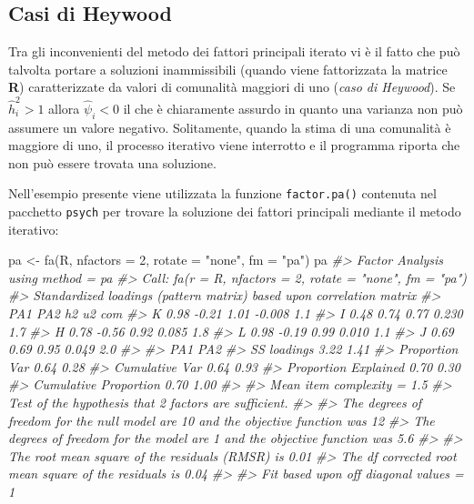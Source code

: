 \documentclass[
  11pt,
]{krantz}
\makeatletter
\newenvironment{Shaded}{\begin{snugshade}}{\end{snugshade}}
\newcommand{\AttributeTok}[1]{\textcolor[rgb]{0.61,0.61,0.61}{#1}}
\newcommand{\CommentTok}[1]{\textcolor[rgb]{0.37,0.37,0.37}{\textit{#1}}}
\newcommand{\DecValTok}[1]{\textcolor[rgb]{0.06,0.06,0.06}{#1}}
\newcommand{\FunctionTok}[1]{\textcolor[rgb]{0,0,0}{#1}}
\newcommand{\NormalTok}[1]{#1}
\newcommand{\OtherTok}[1]{\textcolor[rgb]{0.37,0.37,0.37}{#1}}
\newcommand{\StringTok}[1]{\textcolor[rgb]{0.5,0.5,0.5}{#1}}
\newenvironment{kframe}{%
\medskip{}
\setlength{\fboxsep}{.8em}
 \def\at@end@of@kframe{}%
 \ifinner\ifhmode%
  \def\at@end@of@kframe{\end{minipage}}%
  \begin{minipage}{\columnwidth}%
 \fi\fi%
 \def\FrameCommand##1{\hskip\@totalleftmargin \hskip-\fboxsep
 \colorbox{shadecolor}{##1}\hskip-\fboxsep
     \hskip-\linewidth \hskip-\@totalleftmargin \hskip\columnwidth}%
 \MakeFramed {\advance\hsize-\width
   \@totalleftmargin\z@ \linewidth\hsize
   \@setminipage}}%
 {\par\unskip\endMakeFramed%
 \at@end@of@kframe}
\renewenvironment{Shaded}{\begin{kframe}}{\end{kframe}}
\theoremstyle{definition}
\theoremstyle{definition}
\theoremstyle{definition}
\theoremstyle{definition}
\theoremstyle{remark}
\makeatother
\begin{document}
\hypertarget{casi-di-heywood}{%
\subsection{Casi di Heywood}\label{casi-di-heywood}}

Tra gli inconvenienti del metodo dei fattori principali iterato vi è il fatto che può talvolta portare a soluzioni inammissibili (quando viene fattorizzata la matrice \textbf{R}) caratterizzate da valori di comunalità maggiori di uno (\emph{caso di Heywood}). Se \(\hat{h}^2_i > 1\) allora \(\hat{\psi}_i < 0\) il che è chiaramente assurdo in quanto una varianza non può assumere un valore negativo. Solitamente, quando la stima di una comunalità è maggiore di uno, il processo iterativo viene interrotto e il programma riporta che non può essere trovata una soluzione.

Nell'esempio presente viene utilizzata la funzione \texttt{factor.pa()} contenuta nel pacchetto \texttt{psych} per trovare la soluzione dei fattori principali mediante il metodo iterativo:

\begin{Shaded}
\begin{Highlighting}[]
\NormalTok{pa }\OtherTok{\textless{}{-}} \FunctionTok{fa}\NormalTok{(R, }\AttributeTok{nfactors =} \DecValTok{2}\NormalTok{, }\AttributeTok{rotate =} \StringTok{"none"}\NormalTok{, }\AttributeTok{fm =} \StringTok{"pa"}\NormalTok{)}
\NormalTok{pa}
\CommentTok{\#\textgreater{} Factor Analysis using method =  pa}
\CommentTok{\#\textgreater{} Call: fa(r = R, nfactors = 2, rotate = "none", fm = "pa")}
\CommentTok{\#\textgreater{} Standardized loadings (pattern matrix) based upon correlation matrix}
\CommentTok{\#\textgreater{}    PA1   PA2   h2     u2 com}
\CommentTok{\#\textgreater{} K 0.98 {-}0.21 1.01 {-}0.008 1.1}
\CommentTok{\#\textgreater{} I 0.48  0.74 0.77  0.230 1.7}
\CommentTok{\#\textgreater{} H 0.78 {-}0.56 0.92  0.085 1.8}
\CommentTok{\#\textgreater{} L 0.98 {-}0.19 0.99  0.010 1.1}
\CommentTok{\#\textgreater{} J 0.69  0.69 0.95  0.049 2.0}
\CommentTok{\#\textgreater{} }
\CommentTok{\#\textgreater{}                        PA1  PA2}
\CommentTok{\#\textgreater{} SS loadings           3.22 1.41}
\CommentTok{\#\textgreater{} Proportion Var        0.64 0.28}
\CommentTok{\#\textgreater{} Cumulative Var        0.64 0.93}
\CommentTok{\#\textgreater{} Proportion Explained  0.70 0.30}
\CommentTok{\#\textgreater{} Cumulative Proportion 0.70 1.00}
\CommentTok{\#\textgreater{} }
\CommentTok{\#\textgreater{} Mean item complexity =  1.5}
\CommentTok{\#\textgreater{} Test of the hypothesis that 2 factors are sufficient.}
\CommentTok{\#\textgreater{} }
\CommentTok{\#\textgreater{} The degrees of freedom for the null model are  10  and the objective function was  12}
\CommentTok{\#\textgreater{} The degrees of freedom for the model are 1  and the objective function was  5.6 }
\CommentTok{\#\textgreater{} }
\CommentTok{\#\textgreater{} The root mean square of the residuals (RMSR) is  0.01 }
\CommentTok{\#\textgreater{} The df corrected root mean square of the residuals is  0.04 }
\CommentTok{\#\textgreater{} }
\CommentTok{\#\textgreater{} Fit based upon off diagonal values = 1}
\end{Highlighting}
\end{Shaded}
\end{document}
